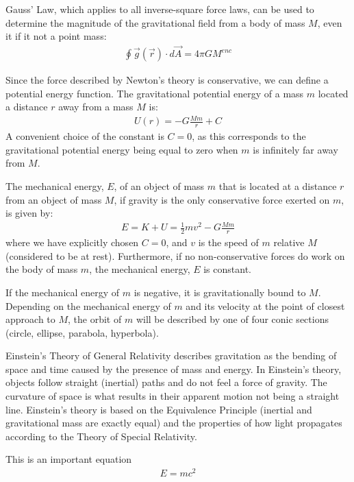 \begin{chapterSummary}
Gauss' Law, which applies to all inverse-square force laws, can be used to determine the magnitude of the gravitational field from a body of mass $M$, even it if it not a point mass:
\begin{align*}
\oint \vec g(\vec r) \cdot d\vec A = 4\pi G M^{enc}
\end{align*}

Since the force described by Newton's theory is conservative, we can define a potential energy function. The gravitational potential energy of a mass $m$ located a distance $r$ away from a mass $M$ is:
\begin{align*}
U(r) = -G\frac{Mm}{r} + C
\end{align*}
A convenient choice of the constant is $C=0$, as this corresponds to the gravitational potential energy being equal to zero when $m$ is infinitely far away from $M$.

The mechanical energy, $E$, of an object of mass $m$ that is located at a distance $r$ from an object of mass $M$, if gravity is the only conservative force exerted on $m$, is given by:
\begin{align*}
E = K + U = \frac{1}{2}mv^2 - G\frac{Mm}{r}
\end{align*}
where we have explicitly chosen $C=0$, and $v$ is the speed of $m$ relative $M$ (considered to be at rest). Furthermore, if no non-conservative forces do work on the body of mass $m$, the mechanical energy, $E$ is constant.

If the mechanical energy of $m$ is negative, it is gravitationally bound to $M$. Depending on the mechanical energy of $m$ and its velocity at the point of closest approach to $M$, the orbit of $m$ will be described by one of four conic sections (circle, ellipse, parabola, hyperbola).

Einstein's Theory of General Relativity describes gravitation as the bending of space and time caused by the presence of mass and energy. In Einstein's theory, objects follow straight (inertial) paths and do not feel a force of gravity. The curvature of space is what results in their apparent motion not being a straight line. Einstein's theory is based on the Equivalence Principle (inertial and gravitational mass are exactly equal) and the properties of how light propagates according to the Theory of Special Relativity.

\end{chapterSummary}

\newpage
\begin{importantEquations}
This is an important equation
\begin{align*}
E = mc^2
\end{align*}

\end{importantEquations}


